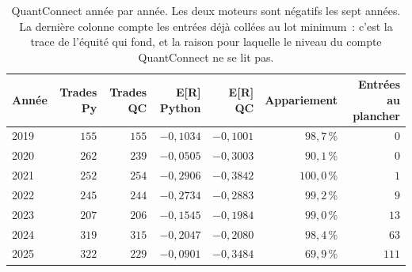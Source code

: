 \begin{table}[htbp]
\centering
\footnotesize
\setlength{\tabcolsep}{4pt}
\caption{QuantConnect année par année. Les deux moteurs sont négatifs les sept années. La dernière colonne compte les entrées déjà collées au lot minimum~: c'est la trace de l'équité qui fond, et la raison pour laquelle le niveau du compte QuantConnect ne se lit pas.}
\label{tab:x10_qc_by_year}
\begin{tabular}{l r r r r r r}
\toprule
\textbf{Année} & \textbf{Trades Py} & \textbf{Trades QC} & \textbf{E[R] Python} & \textbf{E[R] QC} & \textbf{Appariement} & \textbf{Entrées au plancher} \\
\midrule
2019 & $155$ & $155$ & $-0{,}1034$ & $-0{,}1001$ & $98{,}7$\,\% & $0$ \\
2020 & $262$ & $239$ & $-0{,}0505$ & $-0{,}3003$ & $90{,}1$\,\% & $0$ \\
2021 & $252$ & $254$ & $-0{,}2906$ & $-0{,}3842$ & $100{,}0$\,\% & $1$ \\
2022 & $245$ & $244$ & $-0{,}2734$ & $-0{,}2883$ & $99{,}2$\,\% & $9$ \\
2023 & $207$ & $206$ & $-0{,}1545$ & $-0{,}1984$ & $99{,}0$\,\% & $13$ \\
2024 & $319$ & $315$ & $-0{,}2047$ & $-0{,}2080$ & $98{,}4$\,\% & $63$ \\
2025 & $322$ & $229$ & $-0{,}0901$ & $-0{,}3484$ & $69{,}9$\,\% & $111$ \\
\bottomrule
\end{tabular}
\end{table}
